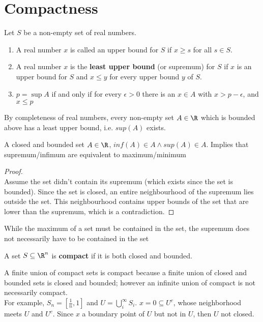 \documentclass[11pt]{article}
\begin{document}
\section{Compactness}

\begin{defn*}
  \label{least upper bound}
  Let $S$ be a non-empty set of real numbers.
  \begin{enumerate}
    \item A real number $x$ is called an upper bound for $S$ if $x \geq s$ for all $s \in S$.
    \item A real number $x$ is the \textbf{least upper bound} (or supremum) for $S$ if $x$ is an upper bound for $S$ and $x \leq y$ for every upper bound $y$ of $S$.
    \item $p=\sup A$ if and only if for every $\epsilon >0$ there is an $x\in A$ with $x>p-\epsilon$, and $x\leq p$
  \end{enumerate}
\end{defn*}

\begin{theorem*}
  \label{complete axioms}
   By completeness of real numbers, every non-empty set $A\in \R$ which is bounded above has a least upper bound, i.e. $sup(A)$ exists.
\end{theorem*}


\begin{proposition*}
  A closed and bounded set $A \in\R$, $inf(A)\in A \land sup(A)\in A$. Implies that supremum/infimum are equivalent to maximum/minimum
  \begin{proof}
    $ $\\
    Assume the set didn't contain its supremum (which exists since the set is bounded). Since the set is closed, an entire neighbourhood of the supremum lies outside the set. This neighbourhood contains upper bounds of the set that are lower than the supremum, which is a contradiction.
  \end{proof}
  \begin{note}
    While the maximum of a set must be contained in the set, the supremum does not necessarily have to be contained in the set
  \end{note}
\end{proposition*}


\begin{defn*}
  \label{compactness}
  A set $S\subseteq \R^n$ is \textbf{compact} if it is both closed and bounded.

  \begin{rem}
    A finite union of compact sets is compact because a finite union of closed and bounded sets is closed and bounded; however an infinite union of compact is not necessarily compact. \\
    For example, $S_n = [\frac{1}{n}, 1]$ and $U=\bigcup_i^{\infty}{S_i}$. $x = 0\subseteq U^c$, whose neighborhood meets $U$ and $U^c$. Since $x$ a boundary point of $U$ but not in $U$, then $U$ not closed.
  \end{rem}
\end{defn*}
\end{document}
